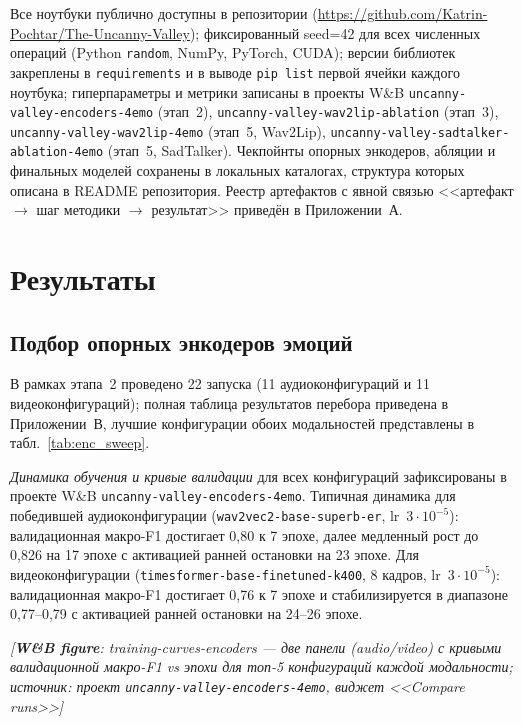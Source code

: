\documentclass[a4paper, 12pt, oneside, openany]{article}
\begin{document}
Все ноутбуки публично доступны в репозитории (\url{https://github.com/Katrin-Pochtar/The-Uncanny-Valley}); фиксированный seed=42 для всех численных операций (Python \texttt{random}, NumPy, PyTorch, CUDA); версии библиотек закреплены в \texttt{requirements} и в выводе \texttt{pip list} первой ячейки каждого ноутбука; гиперпараметры и метрики записаны в проекты W\&B \texttt{uncanny-valley-encoders-4emo} (этап~2), \texttt{uncanny-valley-wav2lip-ablation} (этап~3), \texttt{uncanny-valley-wav2lip-4emo} (этап~5, Wav2Lip), \texttt{uncanny-valley-sadtalker-ablation-4emo} (этап~5, SadTalker). Чекпойнты опорных энкодеров, абляции и финальных моделей сохранены в локальных каталогах, структура которых описана в README репозитория. Реестр артефактов с явной связью <<артефакт $\to$ шаг методики $\to$ результат>> приведён в Приложении~А.

\section{Результаты}

\subsection{Подбор опорных энкодеров эмоций}

В рамках этапа~2 проведено 22 запуска (11 аудиоконфигураций и 11 видеоконфигураций); полная таблица результатов перебора приведена в Приложении~В, лучшие конфигурации обоих модальностей представлены в табл.~\ref{tab:enc_sweep}.

\textit{Динамика обучения и кривые валидации} для всех конфигураций зафиксированы в проекте W\&B \texttt{uncanny-valley-encoders-4emo}. Типичная динамика для победившей аудиоконфигурации (\texttt{wav2vec2-base-superb-er}, lr~$3\!\cdot\!10^{-5}$): валидационная макро-F1 достигает 0,80 к 7 эпохе, далее медленный рост до 0,826 на 17 эпохе с активацией ранней остановки на 23 эпохе. Для видеоконфигурации (\texttt{timesformer-base-finetuned-k400}, 8 кадров, lr~$3\!\cdot\!10^{-5}$): валидационная макро-F1 достигает 0,76 к 7 эпохе и стабилизируется в диапазоне 0,77--0,79 с активацией ранней остановки на 24--26 эпохе.

\begin{center}
\textit{[\textbf{W\&B figure}: training-curves-encoders --- две панели (audio/video) с кривыми валидационной макро-F1 vs эпохи для топ-5 конфигураций каждой модальности; источник: проект \texttt{uncanny-valley-encoders-4emo}, виджет <<Compare runs>>]}
\end{center}
\end{document}
